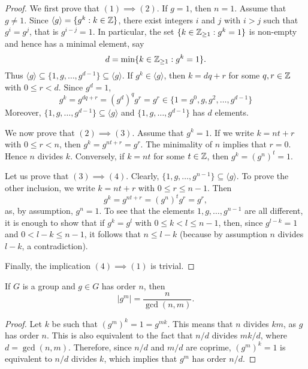 \begin{proof}
        We first prove that $(1)\implies(2)$.
        If $g=1$, then $n=1$. Assume that $g\ne1$. Since $\langle g\rangle=\{g^k:k\in\mathbb{Z}\}$,
        there exist integers $i$ and $j$ with $i>j$ such that $g^i=g^j$, that is $g^{i-j}=1$. In particular,
        the set $\{k\in\mathbb{Z}_{\geq1}:g^k=1\}$ is non-empty and hence has a minimal element, say 
        \[
        d=\min\{k\in\mathbb{Z}_{\geq1}:g^k=1\}.
        \]
        Thus $\langle g\rangle\subseteq\{1,g,\dots,g^{d-1}\}\subseteq\langle g\rangle$. 
        If $g^k\in\langle g\rangle$, then $k=dq+r$ for some $q,r\in\mathbb{Z}$ with $0\leq r<d$. Since $g^d=1$,
        \[
        g^k=g^{dq+r}=(g^d)^qg^r=g^r\in\{1=g^0,g,g^2,\dots,g^{d-1}\}
        \]
        Moreover, $\{1,g,\dots,g^{d-1}\}\subseteq \langle g\rangle$ and 
        $\{1,g,\dots,g^{d-1}\}$ has $d$ elements.

        We now prove that $(2)\implies(3)$. Assume that $g^k=1$. If 
        we write $k=nt+r$ with $0\leq r<n$, then $g^k=g^{nt+r}=g^r$. The minimality of $n$ 
        implies that $r=0$. Hence $n$ divides $k$.
        Conversely, if $k=nt$ for some $t\in\mathbb{Z}$, then $g^k=(g^n)^t=1$.

        Let us prove that $(3)\implies(4)$. Clearly, 
        $\{1,g,\dots,g^{n-1}\}\subseteq\langle g\rangle$. To prove the other 
        inclusion, we write $k=nt+r$ with $0\leq r\leq n-1$. Then 
        \[
                g^k=g^{nt+r}=(g^n)^tg^r=g^r, 
        \]
        as, by assumption, $g^n=1$. To see that the elements 
        $1,g,\dots,g^{n-1}$ are all different, it is enough to show that if $g^k=g^l$ with $0\leq
        k<l\leq n-1$, then, since $g^{l-k}=1$ and $0<l-k\leq n-1$, it follows that 
        $n\leq l-k$ (because by assumption $n$ divides $l-k$, a contradiction).

        Finally, the implication $(4)\implies(1)$ is trivial.
\end{proof}

\begin{corollary}
        If $G$ is a group and $g\in G$ has order $n$, 
        then 
        \[
        |g^m|=\frac{n}{\gcd(n,m)}.
        \]
        \end{corollary}
        
\begin{proof}
        Let $k$ be such that $(g^m)^k=1=g^{mk}$. This means that $n$ divides $km$, as $g$ 
        has order $n$. This is also equivalent to the fact that 
        $n/d$ divides $mk/d$, where $d=\gcd(n,m)$. Therefore, since $n/d$ and $m/d$ 
        are coprime, $(g^m)^k=1$ is equivalent to  
        $n/d$ divides $k$, which implies that $g^m$ has order $n/
        d$.
\end{proof}
        
